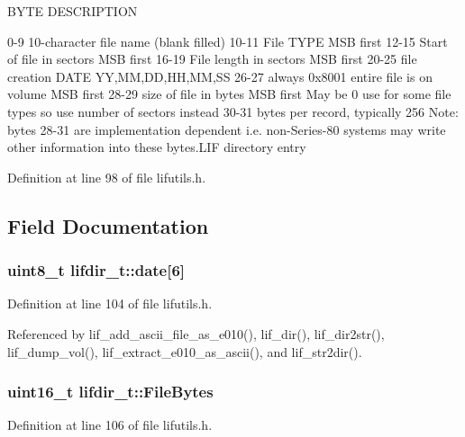 B\+Y\+TE D\+E\+S\+C\+R\+I\+P\+T\+I\+ON 

 0-\/9 10-\/character file name (blank filled) 10-\/11 File T\+Y\+PE M\+SB first 12-\/15 Start of file in sectors M\+SB first 16-\/19 File length in sectors M\+SB first 20-\/25 file creation D\+A\+TE YY,MM,DD,HH,MM,SS 26-\/27 always 0x8001 entire file is on volume M\+SB first 28-\/29 size of file in bytes M\+SB first May be 0 use for some file types so use number of sectors instead 30-\/31 bytes per record, typically 256 Note\+: bytes 28-\/31 are implementation dependent i.\+e. non-\/\+Series-\/80 systems may write other information into these bytes.\+L\+IF directory entry 

Definition at line 98 of file lifutils.\+h.



\subsection{Field Documentation}
\subsubsection[{\texorpdfstring{date}{date}}]{\setlength{\rightskip}{0pt plus 5cm}uint8\+\_\+t lifdir\+\_\+t\+::date\mbox{[}6\mbox{]}}\hypertarget{structlifdir__t_afb6d03670642d3bf86f460ae246ceb0b}{}\label{structlifdir__t_afb6d03670642d3bf86f460ae246ceb0b}


Definition at line 104 of file lifutils.\+h.



Referenced by lif\+\_\+add\+\_\+ascii\+\_\+file\+\_\+as\+\_\+e010(), lif\+\_\+dir(), lif\+\_\+dir2str(), lif\+\_\+dump\+\_\+vol(), lif\+\_\+extract\+\_\+e010\+\_\+as\+\_\+ascii(), and lif\+\_\+str2dir().

\subsubsection[{\texorpdfstring{File\+Bytes}{FileBytes}}]{\setlength{\rightskip}{0pt plus 5cm}uint16\+\_\+t lifdir\+\_\+t\+::\+File\+Bytes}\hypertarget{structlifdir__t_a6e2414bf7966358862b59c5eaf3903f2}{}\label{structlifdir__t_a6e2414bf7966358862b59c5eaf3903f2}


Definition at line 106 of file lifutils.\+h.




